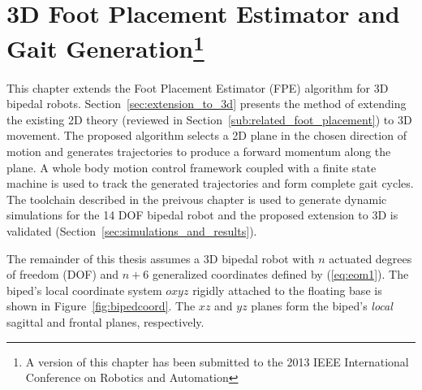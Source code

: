 \chapter[3D Foot Placement Estimator and Gait Generation]{3D Foot Placement Estimator and Gait Generation\footnote{A version of this chapter has been submitted to the 2013 IEEE International Conference on Robotics and Automation}} %
\label{cha:simulations}

This chapter extends the Foot Placement Estimator (FPE) algorithm for 3D bipedal robots. Section~\ref{sec:extension_to_3d} presents the method of extending the existing 2D theory (reviewed in Section~\ref{sub:related_foot_placement}) to 3D movement. The proposed algorithm selects a 2D plane in the chosen direction of motion and generates trajectories to produce a forward momentum along the plane. A whole body motion control framework coupled with a finite state machine is used to track the generated trajectories and form complete gait cycles. The toolchain described in the preivous chapter is used to generate dynamic simulations for the 14 DOF bipedal robot and the proposed extension to 3D is validated (Section~\ref{sec:simulations_and_results}).

The remainder of this thesis assumes a 3D bipedal robot with $n$ actuated degrees of freedom (DOF) and $n+6$ generalized coordinates defined by (\ref{eq:eom1}). The biped's local coordinate system $oxyz$ rigidly attached to the floating base is shown in Figure~\ref{fig:bipedcoord}. The $xz$ and $yz$ planes form the biped's \emph{local} sagittal and frontal planes, respectively. 

